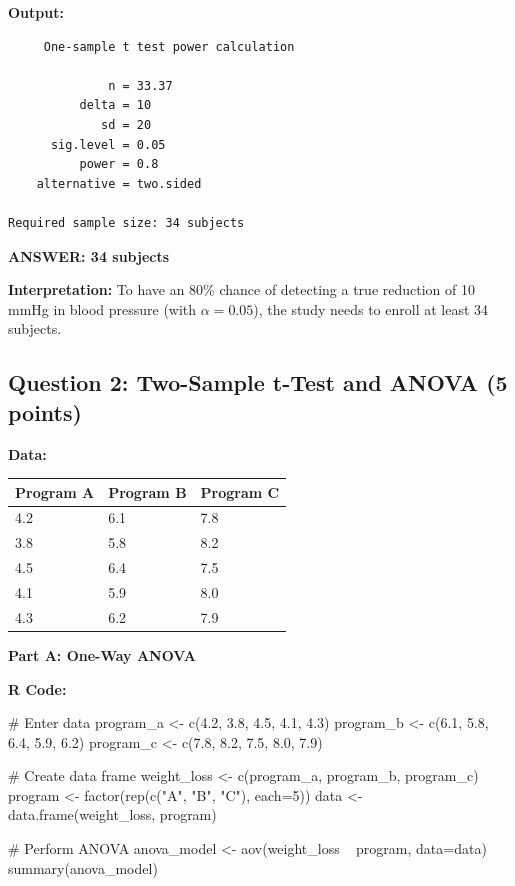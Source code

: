 \documentclass[11pt]{article}
\begin{document}
\textbf{Output:}
\begin{verbatim}
     One-sample t test power calculation

              n = 33.37
          delta = 10
             sd = 20
      sig.level = 0.05
          power = 0.8
    alternative = two.sided

Required sample size: 34 subjects
\end{verbatim}

\vspace{0.3cm}

\textcolor{answergreen}{\textbf{ANSWER: 34 subjects}}

\vspace{0.3cm}

\textbf{Interpretation:} To have an 80\% chance of detecting a true reduction of 10 mmHg in blood pressure (with $\alpha = 0.05$), the study needs to enroll at least 34 subjects.

\vspace{1cm}

\subsection*{Question 2: Two-Sample t-Test and ANOVA (5 points)}

\textbf{Data:}
\begin{center}
\begin{tabular}{lll}
\toprule
Program A & Program B & Program C \\
\midrule
4.2 & 6.1 & 7.8 \\
3.8 & 5.8 & 8.2 \\
4.5 & 6.4 & 7.5 \\
4.1 & 5.9 & 8.0 \\
4.3 & 6.2 & 7.9 \\
\bottomrule
\end{tabular}
\end{center}

\vspace{0.5cm}

\textbf{Part A: One-Way ANOVA}

\vspace{0.3cm}

\textbf{R Code:}

\begin{rcode}
# Enter data
program_a <- c(4.2, 3.8, 4.5, 4.1, 4.3)
program_b <- c(6.1, 5.8, 6.4, 5.9, 6.2)
program_c <- c(7.8, 8.2, 7.5, 8.0, 7.9)

# Create data frame
weight_loss <- c(program_a, program_b, program_c)
program <- factor(rep(c("A", "B", "C"), each=5))
data <- data.frame(weight_loss, program)

# Perform ANOVA
anova_model <- aov(weight_loss ~ program, data=data)
summary(anova_model)
\end{rcode}
\end{document}
